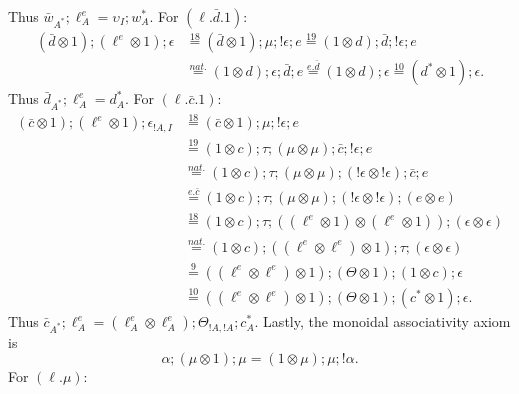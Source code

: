 \documentclass[10pt,a4paper]{amsart}
\newcommand{\by}[1]{\overset{\scriptscriptstyle #1}{=}}
\begin{document}
Thus $\bar w_{A^*};\ell_A^e=\upsilon_I;w_A^*$.
For $(\ell.\bar d.1)$:
\begin{align*}
(\bar d\otimes1);(\ell^e\otimes1);\epsilon
&\by{18}(\bar d\otimes1);\mu;!\epsilon;e
\by{19}(1\otimes d);\bar d;!\epsilon;e\\
&\by{nat.}(1\otimes d);\epsilon;\bar d;e
\by{e.\bar d}(1\otimes d);\epsilon
\by{10}(d^*\otimes1);\epsilon.
\end{align*}
Thus $\bar d_{A^*};\ell_A^e=d_A^*$.
For $(\ell.\bar c.1)$:
\begin{align*}
(\bar c\otimes1);(\ell^e\otimes1);\epsilon_{!A,I}
&\by{18}(\bar c\otimes1);\mu;!\epsilon;e\\
&\by{19}(1\otimes c);\tau;(\mu\otimes\mu);\bar c;!\epsilon;e\\
&\by{nat.}(1\otimes c);\tau;(\mu\otimes\mu);(!\epsilon\otimes!\epsilon);\bar c;e\\
&\by{e.\bar c}(1\otimes c);\tau;(\mu\otimes\mu);(!\epsilon\otimes!\epsilon);(e\otimes e)\\
&\by{18}(1\otimes c);\tau;((\ell^e\otimes1)\otimes(\ell^e\otimes1));(\epsilon\otimes\epsilon)\\
&\by{nat.}(1\otimes c);((\ell^e\otimes\ell^e)\otimes1);\tau;(\epsilon\otimes\epsilon)\\
&\by{9}((\ell^e\otimes\ell^e)\otimes1);(\Theta\otimes1);(1\otimes c);\epsilon\\
&\by{10}((\ell^e\otimes\ell^e)\otimes1);(\Theta\otimes1);(c^*\otimes1);\epsilon.
\end{align*}
Thus $\bar c_{A^*};\ell_A^e=(\ell_A^e\otimes\ell_A^e);\Theta_{!A,!A};c_A^*$.
Lastly, the monoidal associativity axiom is
\begin{equation}
\alpha;(\mu\otimes1);\mu=(1\otimes\mu);\mu;!\alpha.\tag{20}
\end{equation}
For $(\ell.\mu)$:
\end{document}
